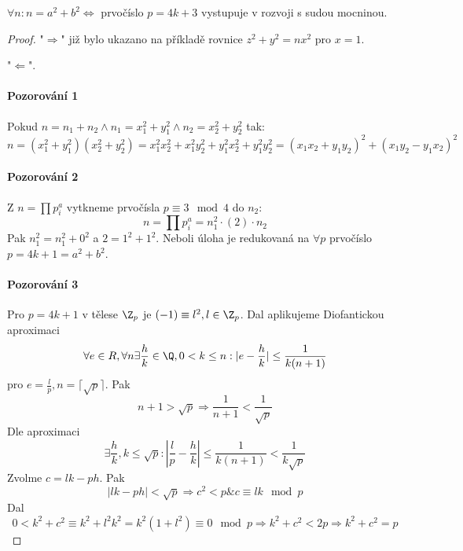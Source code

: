 \begin{theorem}\label{num_th}
	$\forall n: n = a^2 + b^2 \iff$ prvočíslo $p = 4k + 3$ vystupuje v rozvoji s sudou mocninou.
\end{theorem}
\begin{proof}
	"$\Rightarrow$" již bylo ukazano na příkladě rovnice $z^2 + y^2 = n x^2$ pro $x = 1$.

	"$\Leftarrow$".
	\paragraph{Pozorování 1} Pokud $n = n_1 + n_2 \land n_1 = x_1^2 + y_1^2 \land n_2 = x_2^2 + y_2^2$ tak:
	\[ n = (x_1^2 + y_1^2)(x_2^2 + y_2^2) = x_1^2x_2^2 + x_1^2y_2^2 + y_1^2 x_2^2 + y_1^2 y_2^2 = (x_1x_2 + y_1y_2)^2 + (x_1y_2 - y_1x_2)^2 \]

	\paragraph{Pozorování 2} Z $n = \prod p_i^a$ vytkneme prvočísla $p \equiv 3 \mod4$ do $n_2$:
	\[ n = \prod p_i^a = n_1^2 \cdot (2) \cdot n_2 \]
	Pak $n_1^2 = n_1^2 + 0^2$ a $2 = 1^2 + 1^2$.
	Neboli úloha je redukovaná na $\forall p$ prvočíslo $p = 4k + 1 = a^2 + b^2$.

	\paragraph{Pozorování 3} Pro $p = 4k + 1$ v tělese $\Z_p$ je $(-1) \equiv l^2, l \in \Z_p$.
	Dal aplikujeme Diofantickou aproximaci
	\[ \forall e \in R, \forall n \exists \frac{h}{k} \in \Q, 0 < k \leq n: |e - \frac{h}{k}| \leq \frac{1}{k (n + 1)} \]
	pro $e = \frac{l}{p}, n = \lceil \sqrt{p} \rceil $.
	Pak
	\[ n + 1 > \sqrt{p} \Rightarrow \frac{1}{n + 1} < \frac{1}{\sqrt{p}} \]
	Dle aproximaci
	\[ \exists \frac{h}{k}, k \leq \sqrt{p}: \left|\frac{l}{p} - \frac{h}{k}\right| \leq \frac{1}{k (n + 1)} < \frac{1}{k \sqrt{p}} \]
	Zvolme $c = lk - ph$.
	Pak
	\[ |lk - ph| < \sqrt{p} \Rightarrow c^2 < p \& c \equiv lk \mod p \]
	Dal
	\[ 0 < k^2 + c^2 \equiv k^2 + l^2 k^2 = k^2 (1 + l^2) \equiv 0 \mod p \Rightarrow k^2 + c^2 < 2p \Rightarrow k^2 + c^2 = p \]
\end{proof}

